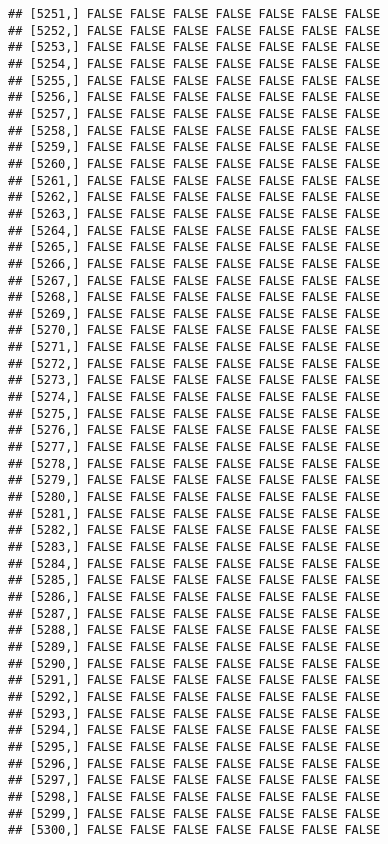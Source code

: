 \documentclass[
]{article}
\begin{document}
\begin{verbatim}
## [5251,] FALSE FALSE FALSE FALSE FALSE FALSE FALSE
## [5252,] FALSE FALSE FALSE FALSE FALSE FALSE FALSE
## [5253,] FALSE FALSE FALSE FALSE FALSE FALSE FALSE
## [5254,] FALSE FALSE FALSE FALSE FALSE FALSE FALSE
## [5255,] FALSE FALSE FALSE FALSE FALSE FALSE FALSE
## [5256,] FALSE FALSE FALSE FALSE FALSE FALSE FALSE
## [5257,] FALSE FALSE FALSE FALSE FALSE FALSE FALSE
## [5258,] FALSE FALSE FALSE FALSE FALSE FALSE FALSE
## [5259,] FALSE FALSE FALSE FALSE FALSE FALSE FALSE
## [5260,] FALSE FALSE FALSE FALSE FALSE FALSE FALSE
## [5261,] FALSE FALSE FALSE FALSE FALSE FALSE FALSE
## [5262,] FALSE FALSE FALSE FALSE FALSE FALSE FALSE
## [5263,] FALSE FALSE FALSE FALSE FALSE FALSE FALSE
## [5264,] FALSE FALSE FALSE FALSE FALSE FALSE FALSE
## [5265,] FALSE FALSE FALSE FALSE FALSE FALSE FALSE
## [5266,] FALSE FALSE FALSE FALSE FALSE FALSE FALSE
## [5267,] FALSE FALSE FALSE FALSE FALSE FALSE FALSE
## [5268,] FALSE FALSE FALSE FALSE FALSE FALSE FALSE
## [5269,] FALSE FALSE FALSE FALSE FALSE FALSE FALSE
## [5270,] FALSE FALSE FALSE FALSE FALSE FALSE FALSE
## [5271,] FALSE FALSE FALSE FALSE FALSE FALSE FALSE
## [5272,] FALSE FALSE FALSE FALSE FALSE FALSE FALSE
## [5273,] FALSE FALSE FALSE FALSE FALSE FALSE FALSE
## [5274,] FALSE FALSE FALSE FALSE FALSE FALSE FALSE
## [5275,] FALSE FALSE FALSE FALSE FALSE FALSE FALSE
## [5276,] FALSE FALSE FALSE FALSE FALSE FALSE FALSE
## [5277,] FALSE FALSE FALSE FALSE FALSE FALSE FALSE
## [5278,] FALSE FALSE FALSE FALSE FALSE FALSE FALSE
## [5279,] FALSE FALSE FALSE FALSE FALSE FALSE FALSE
## [5280,] FALSE FALSE FALSE FALSE FALSE FALSE FALSE
## [5281,] FALSE FALSE FALSE FALSE FALSE FALSE FALSE
## [5282,] FALSE FALSE FALSE FALSE FALSE FALSE FALSE
## [5283,] FALSE FALSE FALSE FALSE FALSE FALSE FALSE
## [5284,] FALSE FALSE FALSE FALSE FALSE FALSE FALSE
## [5285,] FALSE FALSE FALSE FALSE FALSE FALSE FALSE
## [5286,] FALSE FALSE FALSE FALSE FALSE FALSE FALSE
## [5287,] FALSE FALSE FALSE FALSE FALSE FALSE FALSE
## [5288,] FALSE FALSE FALSE FALSE FALSE FALSE FALSE
## [5289,] FALSE FALSE FALSE FALSE FALSE FALSE FALSE
## [5290,] FALSE FALSE FALSE FALSE FALSE FALSE FALSE
## [5291,] FALSE FALSE FALSE FALSE FALSE FALSE FALSE
## [5292,] FALSE FALSE FALSE FALSE FALSE FALSE FALSE
## [5293,] FALSE FALSE FALSE FALSE FALSE FALSE FALSE
## [5294,] FALSE FALSE FALSE FALSE FALSE FALSE FALSE
## [5295,] FALSE FALSE FALSE FALSE FALSE FALSE FALSE
## [5296,] FALSE FALSE FALSE FALSE FALSE FALSE FALSE
## [5297,] FALSE FALSE FALSE FALSE FALSE FALSE FALSE
## [5298,] FALSE FALSE FALSE FALSE FALSE FALSE FALSE
## [5299,] FALSE FALSE FALSE FALSE FALSE FALSE FALSE
## [5300,] FALSE FALSE FALSE FALSE FALSE FALSE FALSE

\end{verbatim}
\end{document}
